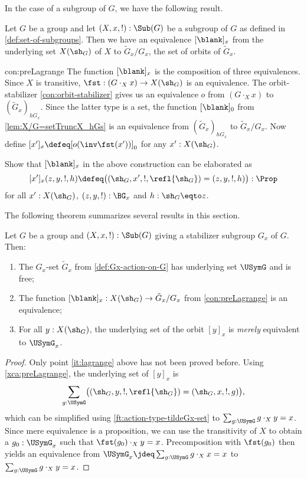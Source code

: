 In the case of a subgroup of $G$, we have the following result.

\begin{construction}\label{con:preLagrange}
  Let $G$ be a group and let $(X,x,!):\Sub(G)$ be a subgroup of $G$ as defined
  in \cref{def:set-of-subgroups}. Then we have an equivalence
  $[\blank]_x$ from the underlying set $X(\sh_G)$ of $X$ to 
  $\tilde G_x /G_x$, the set of orbits of $\tilde G_x$. 
\end{construction}
\begin{implementation}{con:preLagrange}
The function $[\blank]_x$ is the composition of three equivalences.
Since $X$ is transitive, $\fst: (G\cdot_X x)\to X(\sh_G)$ is an equivalence.
The orbit-stabilizer \cref{con:orbit-stabilizer} gives us an equivalence $o$
from $(G\cdot_X x)$ to $(\tilde G_x)_{hG_x}$. Since the latter type is a set,
the function $[\blank]_0$ from \cref{lem:X/G=setTruncX_hGs} 
is an equivalence from $(\tilde G_x)_{hG_x}$ to $\tilde G_x /G_x$.
Now define $[x']_x \defeq [o(\inv\fst(x'))]_0$ for any $x':X(\sh_G)$.
\end{implementation}

\begin{xca}\label{xca:preLagrange}
Show that $[\blank]_x$ in the above construction can be elaborated as
\[
[x']_x(z,y,!,h) \defeq \bigl((\sh_G,x',!,\refl{\sh_G})=(z,y,!,h)\bigr):\Prop
\]
for all $x':X(\sh_G)$, $(z,y,!):\BG_x$ and $h:\sh_G\eqto z$.
\end{xca}

The following theorem summarizes several results in this section.

\begin{theorem}\label{thm:summary5.4}
  Let $G$ be a group and $(X,x,!):\Sub(G)$ giving a 
  stabilizer subgroup $G_x$ of $G$. Then:
  \begin{enumerate}
  \item The $G_x$-set $\tilde G_x$ from \cref{def:Gx-action-on-G}
  has underlying set $\USymG$ and is free; 
  \item
  The function $[\blank]_x : X(\sh_G)\to\tilde G_x /G_x$
  from \cref{con:preLagrange} is an equivalence;
  \item\label{it:lagrange}
  For all $y:X(\sh_G)$, the underlying set of the orbit $[y]_x$ 
  is \emph{merely} equivalent to $\USymG_x$.
  \end{enumerate}
\end{theorem}

\begin{proof}
Only point \ref{it:lagrange} above has not been proved before.
Using \cref{xca:preLagrange}, the underlying set of $[y]_x$ is 
\[
\sum_{g:\USymG}\bigl((\sh_G,y,!,\refl{\sh_G})=(\sh_G,x,!,g)\bigr),
\]
which can be simplified using \cref{ft:action-type-tildeGx-set} to
$\sum_{g:\USymG} g\cdot_X y = x$. 
Since mere equivalence is a proposition,
we can use the transitivity of $X$ to obtain a $g_0:\USymG_x$ such that
$\fst(g_0)\cdot_X y = x$. Precomposition with $\fst(g_0)$ then yields
an equivalence from $\USymG_x \jdeq \sum_{g:\USymG} g\cdot_X x = x$
to $\sum_{g:\USymG} g\cdot_X y = x$.
\end{proof}

